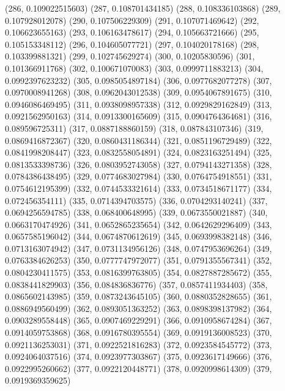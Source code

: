 {					(286, 0.109022515603)
					(287, 0.108701434185)
					(288, 0.108336103868)
					(289, 0.107928012078)
					(290, 0.107506229309)
					(291, 0.107071469642)
					(292, 0.106623655163)
					(293, 0.106163478617)
					(294, 0.105663721666)
					(295, 0.105153348112)
					(296, 0.104605077721)
					(297, 0.104020178168)
					(298, 0.103399881321)
					(299, 0.102745629274)
					(300, 0.10205830596)
					(301, 0.101366911768)
					(302, 0.100671070083)
					(303, 0.0999711883213)
					(304, 0.0992397623232)
					(305, 0.0985054897184)
					(306, 0.0977682077278)
					(307, 0.0970008941268)
					(308, 0.0962043012538)
					(309, 0.0954067891675)
					(310, 0.0946086469495)
					(311, 0.0938098957338)
					(312, 0.0929829162849)
					(313, 0.0921562950163)
					(314, 0.0913300165609)
					(315, 0.0904764364681)
					(316, 0.089596725311)
					(317, 0.0887188860159)
					(318, 0.087843107346)
					(319, 0.0869416872367)
					(320, 0.0860431186344)
					(321, 0.0851196729489)
					(322, 0.0841998208447)
					(323, 0.0832558054891)
					(324, 0.0823163251494)
					(325, 0.0813533398736)
					(326, 0.0803952743058)
					(327, 0.0794143271358)
					(328, 0.0784386438495)
					(329, 0.0774683027984)
					(330, 0.0764754918551)
					(331, 0.0754612195399)
					(332, 0.0744533321614)
					(333, 0.0734518671177)
					(334, 0.072456354111)
					(335, 0.0714394703575)
					(336, 0.0704293140241)
					(337, 0.0694256594785)
					(338, 0.068400648995)
					(339, 0.0673550021887)
					(340, 0.0663170474926)
					(341, 0.0652865235654)
					(342, 0.0642629296409)
					(343, 0.0657585196042)
					(344, 0.0674870612619)
					(345, 0.0693998382148)
					(346, 0.0713163074942)
					(347, 0.0731134956126)
					(348, 0.0747953696264)
					(349, 0.0763384626253)
					(350, 0.0777747972077)
					(351, 0.0791355567341)
					(352, 0.0804230411575)
					(353, 0.0816399763805)
					(354, 0.0827887285672)
					(355, 0.0838441829903)
					(356, 0.084836836776)
					(357, 0.0857411934403)
					(358, 0.0865602143985)
					(359, 0.0873243645105)
					(360, 0.0880352828655)
					(361, 0.0886949560499)
					(362, 0.0893051363252)
					(363, 0.0898398137982)
					(364, 0.0903289558448)
					(365, 0.0907469229291)
					(366, 0.0910958674284)
					(367, 0.0914059753868)
					(368, 0.0916780395554)
					(369, 0.0919136008523)
					(370, 0.0921136253031)
					(371, 0.0922521816283)
					(372, 0.0923584545772)
					(373, 0.0924064037516)
					(374, 0.0923977303867)
					(375, 0.0923617149666)
					(376, 0.0922995260662)
					(377, 0.0922120448771)
					(378, 0.0920998614309)
					(379, 0.0919369359625)
}
